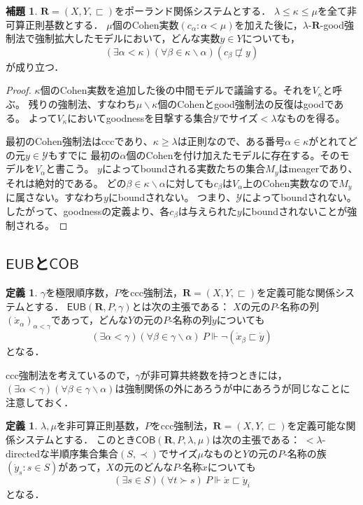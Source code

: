 \documentclass[uplatex,dvipdfmx]{jsarticle}
\newcommand\forces{\Vdash}
\newcommand{\EUB}{\mathsf{EUB}}
\newcommand{\COB}{\mathsf{COB}}
\newcommand{\relR}{\mathbf{R}}
\renewcommand{\setminus}{\smallsetminus}
\theoremstyle{definition}
\newtheorem{defi}[thm]{定義}
\newtheorem{lem}[thm]{補題}
\begin{document}
	\begin{lem}
		$\relR = (X, Y, \sqsubset)$をポーランド関係システムとする．
		$\lambda \le \kappa \le \mu$を全て非可算正則基数とする．
		$\mu$個のCohen実数$(c_\alpha : \alpha < \mu)$を加えた後に，$\lambda$-$\relR$-good強制法で強制拡大したモデルにおいて，どんな実数$y \in Y$についても，
		\[
		(\exists \alpha < \kappa)(\forall \beta \in \kappa \setminus \alpha)(c_\beta \not \sqsubset y)
		\]
		が成り立つ．
	\end{lem}
	\begin{proof}
		$\kappa$個のCohen実数を追加した後の中間モデルで議論する。それを$V_\kappa$と呼ぶ。
		残りの強制法、すなわち$\mu\setminus\kappa$個のCohenとgood強制法の反復はgoodである。
		よって$V_\kappa$においてgoodnessを目撃する集合$\mathcal{Y}$でサイズ${<}\lambda$なものを得る。 

		最初のCohen強制法はcccであり、$\kappa\ge \lambda$は正則なので、ある番号$\alpha\in\kappa$がとれてどの元$y \in \mathcal{Y}$もすでに
		最初の$\alpha$個のCohenを付け加えたモデルに存在する。そのモデルを$V_{\alpha}$と書こう。
		$y$によってboundされる実数たちの集合$M_y$はmeagerであり、それは絶対的である。
		どの$\beta\in\kappa\setminus \alpha$に対しても$c_\beta$は$V_{\alpha}$上のCohen実数なので$M_y$に属さない。すなわち$y$にboundされない。
		つまり、$\mathcal Y$によってboundされない。
		したがって、goodnessの定義より、各$c_\beta$は与えられた$y$にboundされないことが強制される。
	\end{proof}
	
	\subsection{$\EUB$と$\COB$}
	
	\begin{defi}
		$\gamma$を極限順序数，$P$をccc強制法，$\relR = (X, Y, \sqsubset)$を定義可能な関係システムとする．
		$\EUB(\relR, P, \gamma)$とは次の主張である：
		$X$の元の$P$-名称の列$(\dot{x}_\alpha)_{\alpha < \gamma}$であって，どんな$Y$の元の$P$-名称の列$\dot{y}$についても
		\[
		(\exists \alpha < \gamma)(\forall \beta \in \gamma \setminus \alpha)\ P \forces \neg (\dot{x}_\beta \sqsubset \dot{y})
		\]
		となる．
	\end{defi}
	ccc強制法を考えているので，$\gamma$が非可算共終数を持つときには，$(\exists \alpha < \gamma)(\forall \beta \in \gamma \setminus \alpha)$は強制関係の外にあろうが中にあろうが同じなことに注意しておく．
	
	\begin{defi}
		$\lambda, \mu$を非可算正則基数，$P$をccc強制法，$\relR = (X, Y, \sqsubset)$を定義可能な関係システムとする．
		このとき$\COB(\relR, P, \lambda, \mu)$は次の主張である：
		${<}\lambda$-directedな半順序集合集合$(S, \prec)$でサイズ$\mu$なものと$Y$の元の$P$-名称の族$(\dot{y}_s : s \in S)$があって，$X$の元のどんな$P$-名称$\dot{x}$についても
		\[
		(\exists s \in S)(\forall t \succ s) \ P \forces \dot{x} \sqsubset \dot{y}_i
		\]
		となる．
	\end{defi}
\end{document}
